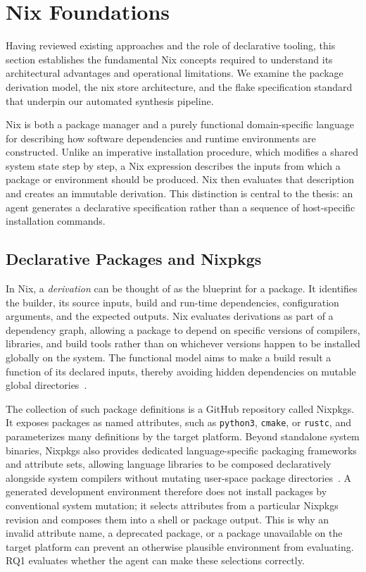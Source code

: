 \section{Nix Foundations}
\label{sec:nix-foundations}

Having reviewed existing approaches and the role of declarative tooling, this
section establishes the fundamental Nix concepts required to understand its
architectural advantages and operational limitations. We examine the package derivation
model, the nix store architecture, and the flake specification standard that underpin
our automated synthesis pipeline.

Nix is both a package manager and a purely functional domain-specific language for
describing how software dependencies and runtime environments are constructed.
Unlike an imperative installation procedure, which modifies a shared system state
step by step, a Nix expression describes the inputs from which a package or
environment should be produced. Nix then evaluates that description and creates an
immutable derivation. This distinction is central to the thesis: an agent generates
a declarative specification rather than a sequence of host-specific installation commands.

\subsection{Declarative Packages and Nixpkgs}

In Nix, a \emph{derivation} can be thought of as the blueprint for a package. It identifies
the builder, its source inputs, build and run-time dependencies, configuration
arguments, and the expected outputs. Nix evaluates derivations as part of a
dependency graph, allowing a package to depend on specific versions of compilers,
libraries, and build tools rather than on whichever versions happen to be installed
globally on the system. The functional model aims to make a build result a
function of its declared inputs, thereby avoiding hidden dependencies on mutable global
directories~\cite{dolstraNixSafePolicyFree,dolstraPurelyFunctionalSystema}.

The collection of such package definitions is a GitHub repository called Nixpkgs.
It exposes packages as named attributes, such as \texttt{python3}, \texttt{cmake},
or \texttt{rustc}, and parameterizes many definitions by the target platform.
Beyond standalone system binaries, Nixpkgs also provides dedicated language-specific
packaging frameworks and attribute sets, allowing language libraries to be
composed declaratively alongside system compilers without mutating user-space
package directories~\cite{NixpkgsManual}. A generated development environment therefore
does not install packages by conventional system mutation; it selects attributes
from a particular Nixpkgs revision and composes them into a shell or package
output. This is why an invalid attribute name, a deprecated package, or a package
unavailable on the target platform can prevent an otherwise plausible environment
from evaluating. RQ1 evaluates whether the agent can make these selections
correctly.

